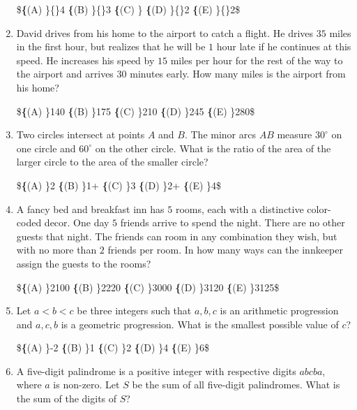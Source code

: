 \documentclass{article}
\begin{document}
\begin{enumerate}[label=\arabic*., itemsep=0.5em]
\$\textbf\{(A) \}\dfrac\{\}4\qquad
\textbf\{(B) \}\dfrac\{\}3\qquad
\textbf\{(C) \}\qquad
\textbf\{(D) \}\dfrac\{\}2\qquad
\textbf\{(E) \}\dfrac\{\}2\$\par \vspace{0.5em}\item David drives from his home to the airport to catch a flight.  He drives $35$ miles in the first hour, but realizes that he will be $1$ hour late if he continues at this speed.  He increases his speed by $15$ miles per hour for the rest of the way to the airport and arrives $30$ minutes early.  How many miles is the airport from his home?

\$\textbf\{(A) \}140\qquad
\textbf\{(B) \}175\qquad
\textbf\{(C) \}210\qquad
\textbf\{(D) \}245\qquad
\textbf\{(E) \}280\qquad\$\par \vspace{0.5em}\item Two circles intersect at points $A$ and $B$.  The minor arcs $AB$ measure $30^\circ$ on one circle and $60^\circ$ on the other circle.  What is the ratio of the area of the larger circle to the area of the smaller circle?

\$\textbf\{(A) \}2\qquad
\textbf\{(B) \}1+\qquad
\textbf\{(C) \}3\qquad
\textbf\{(D) \}2+\qquad
\textbf\{(E) \}4\qquad\$\par \vspace{0.5em}\item A fancy bed and breakfast inn has $5$ rooms, each with a distinctive color-coded decor.  One day $5$ friends arrive to spend the night.  There are no other guests that night.  The friends can room in any combination they wish, but with no more than $2$ friends per room.  In how many ways can the innkeeper assign the guests to the rooms?

\$\textbf\{(A) \}2100\qquad
\textbf\{(B) \}2220\qquad
\textbf\{(C) \}3000\qquad
\textbf\{(D) \}3120\qquad
\textbf\{(E) \}3125\qquad\$\par \vspace{0.5em}\item Let $a<b<c$ be three integers such that $a,b,c$ is an arithmetic progression and $a,c,b$ is a geometric progression.  What is the smallest possible value of $c$?

\$\textbf\{(A) \}-2\qquad
\textbf\{(B) \}1\qquad
\textbf\{(C) \}2\qquad
\textbf\{(D) \}4\qquad
\textbf\{(E) \}6\qquad\$\par \vspace{0.5em}\item A five-digit palindrome is a positive integer with respective digits $abcba$, where $a$ is non-zero.  Let $S$ be the sum of all five-digit palindromes.  What is the sum of the digits of $S$?


\end{enumerate}
\end{document}
